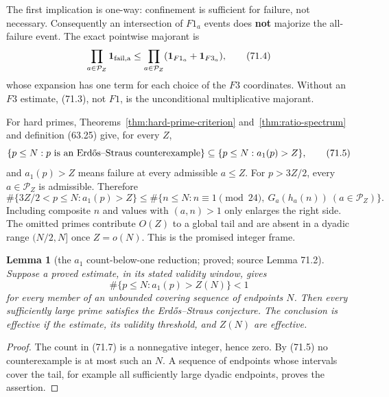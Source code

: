 \documentclass[10pt,reqno]{amsart}
\newtheorem{lemma}[theorem]{Lemma}
\theoremstyle{definition}
\newcommand{\1}{\mathbf 1}
\begin{document}
The first implication is one-way: confinement is sufficient for failure,
not necessary.  Consequently an intersection of $F1_a$ events does \textbf{not}
majorize the all-failure event.  The exact pointwise majorant is
\begin{equation}
  \prod_{a\in\mathcal P_Z}{\bf1}_{\rm fail,a}
  \leq\prod_{a\in\mathcal P_Z}
       ({\bf1}_{F1_a}+{\bf1}_{F3_a}),                    \tag{71.4}
\end{equation}
whose expansion has one term for each choice of the $F3$ coordinates.
Without an $F3$ estimate, (71.3), not $F1$, is the unconditional
multiplicative majorant.

For hard primes, Theorems~\ref{thm:hard-prime-criterion} and~\ref{thm:ratio-spectrum} and definition (63.25) give, for
every $Z$,
\begin{equation}
 \{p\leq N:p\hbox{ is an Erd\H{o}s--Straus counterexample}\}
 \subseteq\{p\leq N:a_1(p)>Z\},                           \tag{71.5}
\end{equation}
and $a_1(p)>Z$ means failure at every admissible $a\leq Z$.
For $p>3Z/2$, every $a\in\mathcal P_Z$ is admissible.  Therefore
\begin{equation}
 \#\{3Z/2<p\leq N:a_1(p)>Z\}
 \leq\#\{n\leq N:n\equiv1\pmod {24},
       \ G_a(h_a(n))\ (a\in\mathcal P_Z)\}.             \tag{71.6}
\end{equation}
Including composite $n$ and values with $(a,n)>1$ only enlarges the
right side.  The omitted primes contribute $O(Z)$ to a global tail and are
absent in a dyadic range $(N/2,N]$ once $Z=o(N)$.  This is the promised
integer frame.

\begin{lemma}[the $a_1$ count-below-one reduction; proved; source Lemma 71.2]\label{lem:a1-count-below-one}  Suppose a
proved estimate, in its stated validity window, gives
\begin{equation}
             \#\{p\leq N:a_1(p)>Z(N)\}<1                 \tag{71.7}
\end{equation}
for every member of an unbounded covering sequence of endpoints $N$.
Then every sufficiently large prime satisfies the Erd\H{o}s--Straus
conjecture.  The conclusion is effective if the estimate, its validity
threshold, and $Z(N)$ are effective.

\end{lemma}
\begin{proof} The count in (71.7) is a nonnegative integer, hence zero.  By
(71.5) no counterexample is at most such an $N$.  A sequence of endpoints
whose intervals cover the tail, for example all sufficiently large dyadic
endpoints, proves the assertion.
\end{proof}
\end{document}
